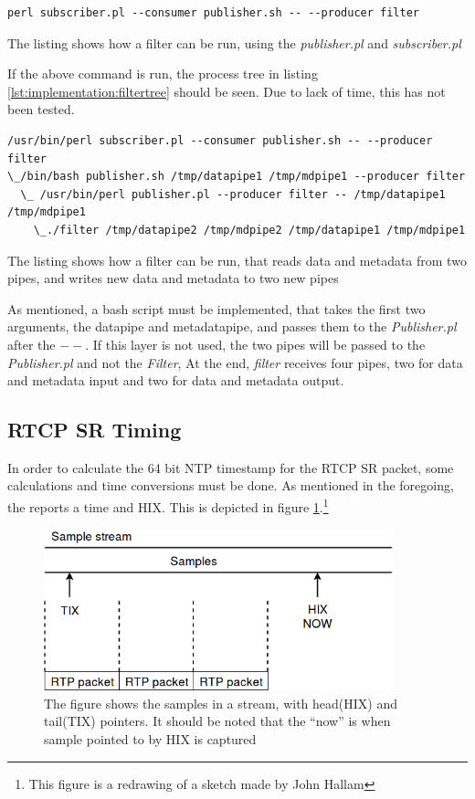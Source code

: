 \begin{listing}[H] 
\begin{verbatim}
perl subscriber.pl --consumer publisher.sh -- --producer filter
\end{verbatim}
\caption{The listing shows how a filter can be run, using the \textit{publisher.pl} and \textit{subscriber.pl}}
\label{lst:implementation:filterrun}
\end{listing}

If the above command is run, the process tree in listing \ref{lst:implementation:filtertree} should be seen. Due to lack of time, this has not been tested.

\begin{listing}[H] 
\begin{verbatim}
/usr/bin/perl subscriber.pl --consumer publisher.sh -- --producer filter
\_/bin/bash publisher.sh /tmp/datapipe1 /tmp/mdpipe1 --producer filter
  \_ /usr/bin/perl publisher.pl --producer filter -- /tmp/datapipe1 /tmp/mdpipe1
    \_./filter /tmp/datapipe2 /tmp/mdpipe2 /tmp/datapipe1 /tmp/mdpipe1
\end{verbatim}
\caption{The listing shows how a filter can be run, that reads data and metadata from two pipes, and writes new data and metadata to two new pipes}
\label{lst:implementation:filtertree}
\end{listing}
As mentioned, a bash script must be implemented, that takes the first two arguments, the datapipe and metadatapipe, and passes them to the \textit{Publisher.pl} after the $--$. If this layer is not used, the two pipes will be passed to the \textit{Publisher.pl} and not the \textit{Filter}, At the end, \textit{filter} receives four pipes, two for data and metadata input and two for data and metadata output.

\subsection{RTCP SR Timing} \label{sec:design:rtcpsr}
In order to calculate the 64 bit NTP timestamp for the RTCP SR packet, some calculations and time conversions must be done. As mentioned in the foregoing, the  reports a time and \ac{HIX}. This is depicted in figure \ref{fig:implementation:rtcpsr}.\footnote{This figure is a redrawing of a sketch made by John Hallam}
\begin{figure}[H]
	\centering
	\includegraphics[width=0.9\textwidth]{figures/rtcp_sr_timing}
	\caption{The figure shows the samples in a stream, with head(HIX) and tail(TIX) pointers. It should be noted that the ``now'' is when sample pointed to by HIX is captured}\label{fig:implementation:rtcpsr}
\end{figure}

